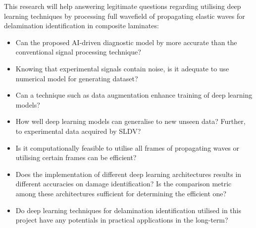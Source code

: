 This research will help answering legitimate questions regarding utilising deep learning techniques by processing full wavefield of propagating elastic waves for delamination identification in composite laminates:
\begin{itemize}
	\item Can the proposed AI-driven diagnostic model by more accurate than the conventional signal processing technique?
	\item Knowing that experimental signals contain noise, is it adequate to use numerical model for generating dataset?
	\item Can a technique such as data augmentation enhance training of deep learning models?
	\item How well deep learning models can generalise to new unseen data? Further, to experimental data acquired by SLDV?
	\item Is it computationally feasible to utilise all frames of propagating waves or utilising certain frames can be efficient?
	\item Does the implementation of different deep learning architectures results in different accuracies on damage identification? Is the comparison metric among these architectures sufficient for determining the efficient one?
	\item Do deep learning techniques for delamination identification utilised in this project have any potentials in practical applications in the long-term?
\end{itemize}
